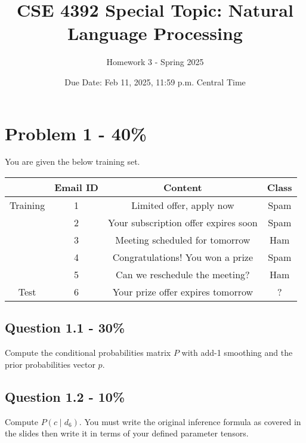 \documentclass{article}
\newcommand{\answerboxbig}{
    \vspace{20cm} %
}
\newcommand{\answerboxsmall}{
    \vspace{3cm} %
}
\begin{document}
\title{CSE 4392 Special Topic: Natural Language Processing}
\author{Homework 3 - Spring 2025}
\date{Due Date: Feb 11, 2025, 11:59 p.m. Central Time}
\maketitle
\thispagestyle{fancy}



\section*{Problem 1 - 40\%}
You are given the below training set.

\begin{center}
    \begin{tabular}{|c|c|c|c|}
    \hline
     & Email ID & Content & Class \\ \hline
    Training & 1 & Limited offer, apply now & Spam \\ \hline
             & 2 & Your subscription offer expires soon & Spam \\ \hline
             & 3 & Meeting scheduled for tomorrow & Ham \\ \hline
             & 4 & Congratulations! You won a prize & Spam \\ \hline
             & 5 & Can we reschedule the meeting? & Ham \\ \hline
    Test    & 6 & Your prize offer expires tomorrow & ? \\ \hline
    \end{tabular}
\end{center}

\subsection*{Question 1.1 - 30\%}
Compute the conditional probabilities matrix $P$ with add-1 smoothing and the prior probabilities vector $p$.

\answerboxbig

\subsection*{Question 1.2 - 10\%}
Compute ${P(c \mid d_{6})}$. You must write the original inference formula as covered in the slides then write it in terms of your defined parameter tensors. 

\answerboxsmall
\end{document}
